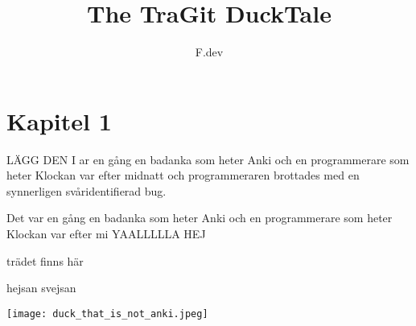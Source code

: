 \documentclass[a4paper]{article}
\begin{document}
\title{The TraGit DuckTale}
\author{F.dev}
\maketitle

\section*{Kapitel 1}

LÄGG DEN I ar en gång en badanka som heter Anki och en programmerare som heter %
Klockan var efter midnatt och programmeraren brottades med en synnerligen svåridentifierad bug.

Det var en gång en badanka som heter Anki och en programmerare som heter %
Klockan var efter mi
YAALLLLLA
HEJ


trädet finns här

hejsan svejsan

\begin{center}
	\texttt{[image: duck\_that\_is\_not\_anki.jpeg]}
\end{center}


\end{document}
